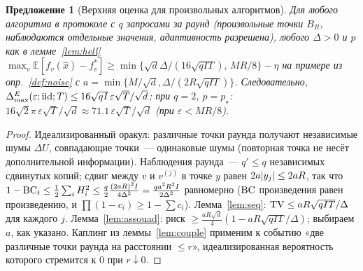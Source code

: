 \documentclass[11pt,a4paper]{article}
\numberwithin{equation}{section}
\newtheorem{proposition}[theorem]{Предложение}
\theoremstyle{definition}
\theoremstyle{remark}
\newcommand{\E}{\mathbb E}\newcommand{\R}{\mathbb R}\newcommand{\Z}{\mathbb Z}\let\Prob\relax\newcommand{\Prob}{\mathbb P}
\newcommand{\Dmax}{\Delta_{\max}}\newcommand{\Dcp}{\Delta_{\rm cp}}\newcommand{\Dlow}{\Delta_{\rm low}}
\begin{document}
\begin{proposition}[Верхняя оценка для произвольных алгоритмов]\label{prop:any}
Для любого алгоритма в протоколе с $q$ запросами за раунд (произвольные точки $B_R$, наблюдаются отдельные значения, адаптивность разрешена), любого $\Delta>0$ и $p$ как в лемме~\ref{lem:hell}
$\max_v\E[f_v(\hat x)-f_v^*]\ge\min\{\sqrt d\Delta/(16\sqrt{qIT}),\,MR/8\}-\eta$ на примере из опр.~\ref{def:noise} с $a=\min\{M/\sqrt d,\Delta/(2R\sqrt{qIT})\}$. Следовательно, $\Dmax^E(\varepsilon;\iid;T)\le16\sqrt{qI}\,\varepsilon\sqrt T/\sqrt d$; при $q=2$, $p=p_\star$: $16\sqrt2\pi\,\varepsilon\sqrt T/\sqrt d\approx71.1\,\varepsilon\sqrt T/\sqrt d$ (при $\varepsilon<MR/8$).
\end{proposition}
\begin{proof}
Идеализированный оракул: различные точки раунда получают независимые шумы $\Delta U$, совпадающие точки~--- одинаковые шумы (повторная точка не несёт дополнительной информации). Наблюдения раунда~--- $q'\le q$ независимых сдвинутых копий; сдвиг между $v$ и $v^{(j)}$ в точке $y$ равен $2a\lvert y_j\rvert\le2aR$, так что $1-\mathrm{BC}_t\le\frac12\sum_iH_i^2\le\frac q2\frac{(2aR)^2I}{4\Delta^2}=\frac{qa^2R^2I}{2\Delta^2}$ равномерно ($\mathrm{BC}$ произведения равен произведению, и $\prod(1-c_i)\ge1-\sum c_i$). Лемма~\ref{lem:seq}: $\mathrm{TV}\le aR\sqrt{qIT}/\Delta$ для каждого $j$. Лемма~\ref{lem:assouad}: риск $\ge\frac{aR\sqrt d}4(1-aR\sqrt{qIT}/\Delta)$; выбираем $a$, как указано. Каплинг из леммы~\ref{lem:couple} применим к событию «две различные точки раунда на расстоянии $\le r$», идеализированная вероятность которого стремится к $0$ при $r\downarrow0$.
\end{proof}
\end{document}
